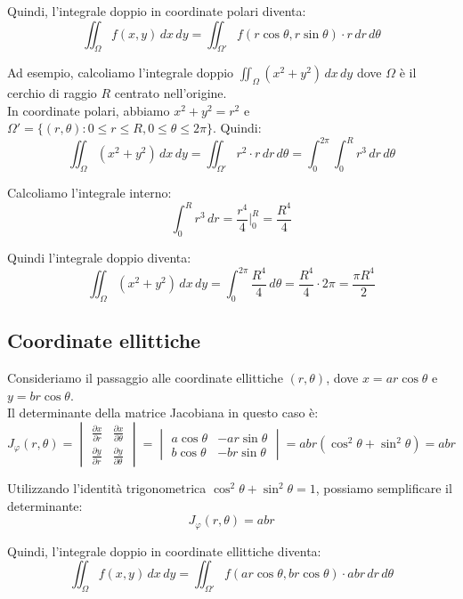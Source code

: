 Quindi, l'integrale doppio in coordinate polari diventa:
\[
\iint_{\Omega} f(x,y) \, dx \, dy = \iint_{\Omega'} f(r \cos \theta, r \sin \theta) \cdot r \, dr \, d\theta
\]

Ad esempio, calcoliamo l'integrale doppio $\iint_{\Omega} (x^2 + y^2) \, dx \, dy$ dove $\Omega$ è il cerchio di raggio $R$ centrato nell'origine.\\
In coordinate polari, abbiamo $x^2 + y^2 = r^2$ e $\Omega' = \{ (r, \theta) : 0 \leq r \leq R, 0 \leq \theta \leq 2\pi \}$. Quindi:
\[
\iint_{\Omega} (x^2 + y^2) \, dx \, dy = \iint_{\Omega'} r^2 \cdot r \, dr \, d\theta = \int_{0}^{2\pi} \int_{0}^{R} r^3 \, dr \, d\theta
\]

Calcoliamo l'integrale interno:
\[
\int_{0}^{R} r^3 \, dr = \frac{r^4}{4} \bigg|_{0}^{R} = \frac{R^4}{4}
\]

Quindi l'integrale doppio diventa:
\[
\iint_{\Omega} (x^2 + y^2) \, dx \, dy = \int_{0}^{2\pi} \frac{R^4}{4} \, d\theta = \frac{R^4}{4} \cdot 2\pi = \frac{\pi R^4}{2}
\]

\subsection{Coordinate ellittiche}
Consideriamo il passaggio alle coordinate ellittiche $(r, \theta)$, dove $x = a r \cos \theta$ e $y = b r \cos \theta$.\\
Il determinante della matrice Jacobiana in questo caso è:
\[
J_{\varphi}(r,\theta) = \begin{vmatrix}
\frac{\partial x}{\partial r} & \frac{\partial x}{\partial \theta} \\
\frac{\partial y}{\partial r} & \frac{\partial y}{\partial \theta}
\end{vmatrix} = \begin{vmatrix}
a \cos \theta & -a r \sin \theta \\
b \cos \theta & -b r \sin \theta
\end{vmatrix} = ab r (\cos^2 \theta + \sin^2 \theta) = abr
\]

Utilizzando l'identità trigonometrica $\cos^2 \theta + \sin^2 \theta = 1$, possiamo semplificare il determinante:
\[
J_{\varphi}(r,\theta) = abr
\]

Quindi, l'integrale doppio in coordinate ellittiche diventa:
\[
\iint_{\Omega} f(x,y) \, dx \, dy = \iint_{\Omega'} f(a r \cos \theta, b r \cos \theta) \cdot abr \, dr \, d\theta
\]




